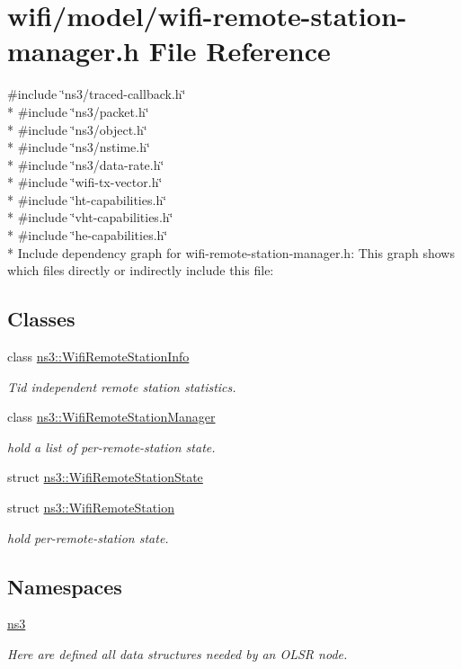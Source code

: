 \hypertarget{wifi-remote-station-manager_8h}{}\section{wifi/model/wifi-\/remote-\/station-\/manager.h File Reference}
\label{wifi-remote-station-manager_8h}
{\ttfamily \#include \char`\"{}ns3/traced-\/callback.\+h\char`\"{}}\\*
{\ttfamily \#include \char`\"{}ns3/packet.\+h\char`\"{}}\\*
{\ttfamily \#include \char`\"{}ns3/object.\+h\char`\"{}}\\*
{\ttfamily \#include \char`\"{}ns3/nstime.\+h\char`\"{}}\\*
{\ttfamily \#include \char`\"{}ns3/data-\/rate.\+h\char`\"{}}\\*
{\ttfamily \#include \char`\"{}wifi-\/tx-\/vector.\+h\char`\"{}}\\*
{\ttfamily \#include \char`\"{}ht-\/capabilities.\+h\char`\"{}}\\*
{\ttfamily \#include \char`\"{}vht-\/capabilities.\+h\char`\"{}}\\*
{\ttfamily \#include \char`\"{}he-\/capabilities.\+h\char`\"{}}\\*
Include dependency graph for wifi-\/remote-\/station-\/manager.h\+:
This graph shows which files directly or indirectly include this file\+:
\subsection*{Classes}
\begin{DoxyCompactItemize}
\item 
class \hyperlink{classns3_1_1WifiRemoteStationInfo}{ns3\+::\+Wifi\+Remote\+Station\+Info}
\begin{DoxyCompactList}\small\item\em Tid independent remote station statistics. \end{DoxyCompactList}\item 
class \hyperlink{classns3_1_1WifiRemoteStationManager}{ns3\+::\+Wifi\+Remote\+Station\+Manager}
\begin{DoxyCompactList}\small\item\em hold a list of per-\/remote-\/station state. \end{DoxyCompactList}\item 
struct \hyperlink{structns3_1_1WifiRemoteStationState}{ns3\+::\+Wifi\+Remote\+Station\+State}
\item 
struct \hyperlink{structns3_1_1WifiRemoteStation}{ns3\+::\+Wifi\+Remote\+Station}
\begin{DoxyCompactList}\small\item\em hold per-\/remote-\/station state. \end{DoxyCompactList}\end{DoxyCompactItemize}
\subsection*{Namespaces}
\begin{DoxyCompactItemize}
\item 
 \hyperlink{namespacens3}{ns3}
\begin{DoxyCompactList}\small\item\em Here are defined all data structures needed by an O\+L\+SR node. \end{DoxyCompactList}\end{DoxyCompactItemize}
